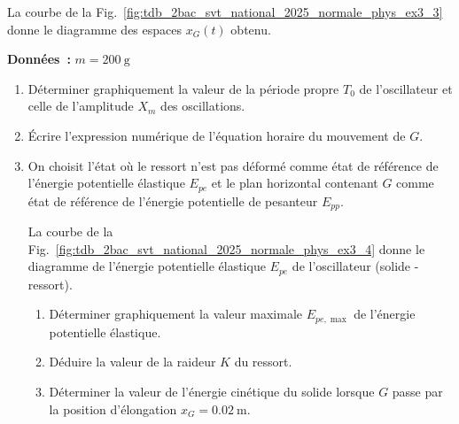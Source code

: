 \begin{minipage}[t][][t]{0.60\linewidth}
La courbe de la Fig.~\ref{fig:tdb_2bac_svt_national_2025_normale_phys_ex3_3}
donne le diagramme des espaces $x_{G}(t)$ obtenu.

\textbf{Données~:} $m=\qty{200}{\g}$
\begin{enumerate}
    \item Déterminer graphiquement la valeur de la période propre $T_{0}$ de
          l'oscillateur et celle de l'amplitude $X_{m}$ des oscillations.
    \item Écrire l'expression numérique de l'équation horaire du mouvement de
          $G$.
    \item On choisit l'état où le ressort n'est pas déformé comme état de
          référence de l'énergie potentielle élastique $E_{pe}$ et le plan
          horizontal contenant $G$ comme état de référence de l'énergie
          potentielle de pesanteur $E_{pp}$.

          La courbe de la
          Fig.~\ref{fig:tdb_2bac_svt_national_2025_normale_phys_ex3_4} donne le
          diagramme de l'énergie potentielle élastique $E_{pe}$ de l'oscillateur
          (solide - ressort).
          \begin{enumerate}
              \item Déterminer graphiquement la valeur maximale $E_{pe,\max}$ de
                    l'énergie potentielle élastique.
              \item Déduire la valeur de la raideur $K$ du ressort.
              \item Déterminer la valeur de l'énergie cinétique du solide
                    lorsque $G$ passe par la position d'élongation
                    ${x_{G}=\qty{0.02}{\m}}$.
          \end{enumerate}
\end{enumerate}
\end{minipage}
\hfill
